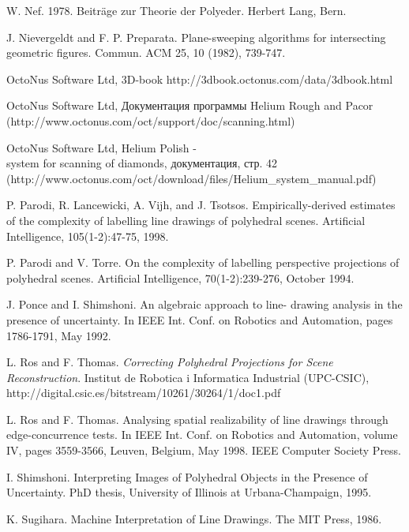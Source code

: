 \documentclass[a4paper,12pt, titlepage]{article}
\begin{document}
\begin{thebibliography}{99}
W. Nef. 1978. Beiträge zur Theorie der Polyeder. Herbert Lang, Bern.

 J. Nievergeldt and F. P. Preparata. Plane-sweeping algorithms for intersecting geometric
figures. Commun. ACM 25, 10 (1982), 739-747.

OctoNus Software Ltd, 3D-book
http://3dbook.octonus.com/data/3dbook.html

OctoNus Software Ltd, Документация программы Helium Rough and Pacor \\
(http://www.octonus.com/oct/support/doc/scanning.html)

OctoNus Software Ltd, Helium Polish - \\
system for scanning of diamonds, 
документация, стр. 42\\
(http://www.octonus.com/oct/download/files/Helium\_system\_manual.pdf)

P. Parodi, R. Lancewicki, A. Vijh, and J. Tsotsos.
Empirically-derived estimates of the complexity of labelling line drawings of polyhedral scenes. 
Artificial Intelligence, 105(1-2):47-75, 1998.

P. Parodi and V. Torre. On the complexity of labelling perspective projections of polyhedral scenes. 
Artificial Intelligence, 70(1-2):239-276, October 1994.

J. Ponce and I. Shimshoni. An algebraic approach to line-
drawing analysis in the presence of uncertainty. In IEEE
Int. Conf. on Robotics and Automation, pages 1786-1791,
May 1992.

L. Ros and F. Thomas. \textit{Correcting Polyhedral Projections for Scene Reconstruction}.
Institut de Robotica i Informatica Industrial (UPC-CSIC), \\
http://digital.csic.es/bitstream/10261/30264/1/doc1.pdf

 L. Ros and F. Thomas. Analysing spatial realizability of
line drawings through edge-concurrence tests. In IEEE
Int. Conf. on Robotics and Automation, volume IV, pages
3559-3566, Leuven, Belgium, May 1998. IEEE Computer
Society Press.

 I. Shimshoni. Interpreting Images of Polyhedral Objects
in the Presence of Uncertainty. PhD thesis, University of
Illinois at Urbana-Champaign, 1995.

K. Sugihara. Machine Interpretation of Line Drawings.
The MIT Press, 1986.


\end{thebibliography}
\end{document}
